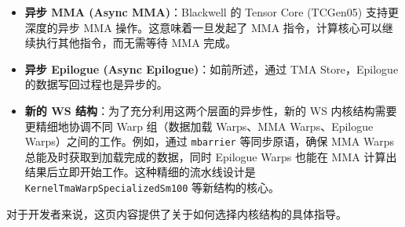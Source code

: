 \begin{itemize}
\item \textbf{异步 MMA (Async MMA)}：Blackwell 的 Tensor Core (TCGen05) 支持更深度的异步 MMA 操作。这意味着一旦发起了 MMA 指令，计算核心可以继续执行其他指令，而无需等待 MMA 完成。
\item \textbf{异步 Epilogue (Async Epilogue)}：如前所述，通过 TMA Store，Epilogue 的数据写回过程也是异步的。
\item \textbf{新的 WS 结构}：为了充分利用这两个层面的异步性，新的 WS 内核结构需要更精细地协调不同 Warp 组（数据加载 Warps、MMA Warps、Epilogue Warps）之间的工作。例如，通过 \texttt{mbarrier} 等同步原语，确保 MMA Warps 总能及时获取到加载完成的数据，同时 Epilogue Warps 也能在 MMA 计算出结果后立即开始工作。这种精细的流水线设计是 \texttt{K\allowbreak{}e\allowbreak{}r\allowbreak{}n\allowbreak{}e\allowbreak{}l\allowbreak{}T\allowbreak{}m\allowbreak{}a\allowbreak{}W\allowbreak{}a\allowbreak{}r\allowbreak{}p\allowbreak{}S\allowbreak{}p\allowbreak{}e\allowbreak{}c\allowbreak{}i\allowbreak{}a\allowbreak{}l\allowbreak{}i\allowbreak{}z\allowbreak{}e\allowbreak{}d\allowbreak{}S\allowbreak{}m\allowbreak{}1\allowbreak{}0\allowbreak{}0} 等新结构的核心。
\end{itemize}

对于开发者来说，这页内容提供了关于如何选择内核结构的具体指导。

